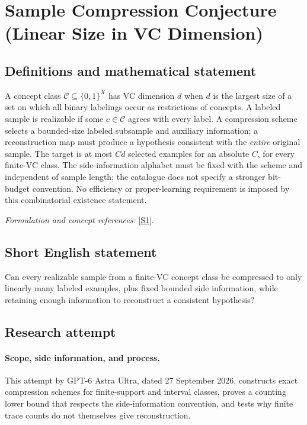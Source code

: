 \documentclass[11pt]{article}
\begin{document}
\section*{\texorpdfstring{Sample Compression Conjecture (Linear Size in VC Dimension)}{Sample Compression Conjecture (Linear Size in VC Dimension)}}\label{30006841}
\subsection{Definitions and mathematical statement}
A concept class $\mathcal C\subseteq\{0,1\}^X$ has VC dimension $d$ when $d$ is the largest size of a set on which all binary labelings occur as restrictions of concepts. A labeled sample is realizable if some $c\in\mathcal C$ agrees with every label. A compression scheme selects a bounded-size labeled subsample and auxiliary information; a reconstruction map must produce a hypothesis consistent with the \emph{entire} original sample. The target is at most $Cd$ selected examples for an absolute $C$, for every finite-VC class. The side-information alphabet must be fixed with the scheme and independent of sample length; the catalogue does not specify a stronger bit-budget convention. No efficiency or proper-learning requirement is imposed by this combinatorial existence statement.
\par\smallskip\textit{Formulation and concept references:} \href{https://arxiv.org/html/2410.13012v1}{[S1]}.

\subsection{Short English statement}
Can every realizable sample from a finite-VC concept class be compressed to only linearly many labeled examples, plus fixed bounded side information, while retaining enough information to reconstruct a consistent hypothesis?
\subsection{Research attempt}
\paragraph{Scope, side information, and process.}
This attempt by GPT-6 Astra Ultra, dated 27 September 2026, constructs exact compression schemes for finite-support and interval classes, proves a counting lower bound that respects the side-information convention, and tests why finite trace counts do not themselves give reconstruction.
\end{document}
